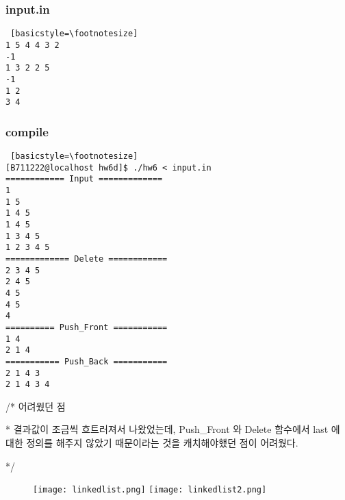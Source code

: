 \documentclass[twoside,twocolumn]{article}
\newenvironment{itemizeReduced}{
\begin{list}{\labelitemi}{\leftmargin=1em}
\setlength{\itemsep}{1pt}
\setlength{\parskip}{0pt}
\setlength{\parsep}{0pt}}{\end{list}
}
\begin{document}
\subsubsection{input.in}
\begin{lstlisting} [basicstyle=\footnotesize]
1 5 4 4 3 2
-1
1 3 2 2 5
-1
1 2
3 4
\end{lstlisting}

\subsubsection{compile}
\begin{lstlisting} [basicstyle=\footnotesize]
[B711222@localhost hw6d]$ ./hw6 < input.in
============ Input =============
1
1 5
1 4 5
1 4 5
1 3 4 5
1 2 3 4 5
============= Delete ============
2 3 4 5
2 4 5
4 5
4 5
4
========== Push_Front ===========
1 4
2 1 4
=========== Push_Back ===========
2 1 4 3
2 1 4 3 4
\end{lstlisting}

\begin{itemizeReduced}
    \item[/*] 어려웠던 점
    \item[*] 결과값이 조금씩 흐트러져서 나왔었는데, Push\_Front 와 Delete 함수에서 last 에 대한 정의를 해주지 않았기 때문이라는 것을 캐치해야했던 점이 어려웠다.
\end{itemizeReduced}
*/

\newpage
\begin{figure}
\centering 
\texttt{[image: linkedlist.png]}
\texttt{[image: linkedlist2.png]}
\end{figure} 



\end{document}
